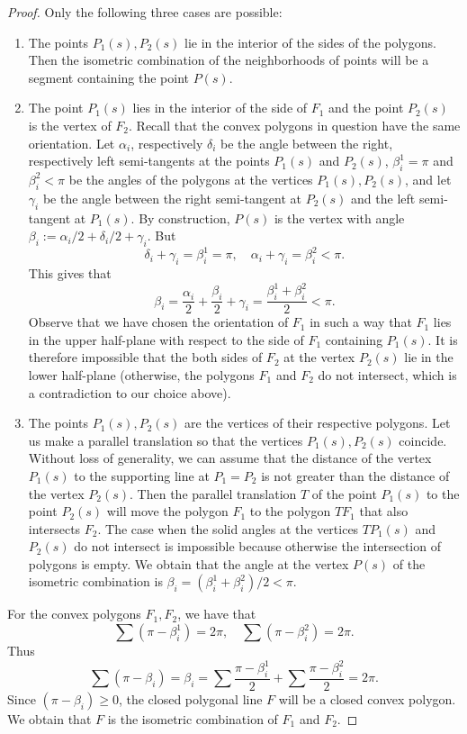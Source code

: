 \documentclass[11pt,oneside]{amsart}
\theoremstyle{theorem}
\theoremstyle{definition}
\theoremstyle{remark}
\begin{document}
\begin{proof}
Only the following three cases are possible:

\begin{enumerate}
\item
The points $P_1(s), P_2(s)$ lie in the interior of the sides of the polygons. Then the isometric combination of the neighborhoods of points will be a segment containing the point $P(s)$.

\item
The point $P_1(s)$ lies in the interior of the side of $F_1$ and the point $P_2(s)$ is the vertex of $F_2$. Recall that the convex polygons in question have the same orientation. Let $\alpha_i$, respectively $\delta_i$ be the angle between the right, respectively left semi-tangents at the points $P_1(s)$ and $P_2(s)$, $\beta^1_i = \pi$ and $\beta^2_i < \pi$ be the angles of the polygons at the vertices $P_1(s), P_2(s)$, and let $\gamma_i$ be the angle between the right semi-tangent at $P_2(s)$ and the left semi-tangent at $P_1(s)$.  By construction, $P(s)$ is the vertex with angle $\beta_i := \alpha_i / 2 + \delta_i / 2 + \gamma_i$. But
\[
\delta_i + \gamma_i = \beta_i^1 = \pi, \quad \alpha_i + \gamma_i = \beta_i^2 < \pi.
\]
This gives that
\[
\beta_i = \frac{\alpha_i}{2} + \frac{\beta_i}{2} + \gamma_i = \frac{\beta^1_i + \beta^2_i}{2} < \pi.
\]
Observe that we have chosen the orientation of $F_1$ in such a way that $F_1$ lies in the upper half-plane with respect to the side of $F_1$ containing $P_1(s)$. It is therefore impossible that the both sides of $F_2$ at the vertex $P_2(s)$ lie in the lower half-plane (otherwise, the polygons $F_1$ and $F_2$ do not intersect, which is a contradiction to our choice above). 

\item
The points $P_1(s), P_2(s)$ are the vertices of their respective polygons. Let us make a parallel translation so that the vertices $P_1(s), P_2(s)$ coincide. Without loss of generality, we can assume that the distance of the vertex $P_1(s)$ to the supporting line at $P_1 = P_2$ is not greater than the distance of the vertex $P_2(s)$. Then the parallel translation $T$ of the point $P_1(s)$ to the point $P_2(s)$ will move the polygon $F_1$ to the polygon $TF_1$ that also intersects $F_2$. The case when the solid angles at the vertices $TP_1(s)$ and $P_2(s)$ do not intersect is impossible because otherwise the intersection of polygons is empty. We obtain that the angle at the vertex $P(s)$ of the isometric combination is $\beta_i = (\beta_i^1 + \beta_i^2)/2 < \pi$. 
\end{enumerate}

For the convex polygons $F_1, F_2$, we have that
\[
\sum (\pi - \beta_i^1) = 2\pi, \quad \sum (\pi - \beta_i^2) = 2\pi.
\]
Thus
\[
\sum (\pi - \beta_i) = \beta_i = \sum \frac{\pi - \beta_i^1}{2} + \sum \frac{\pi - \beta_i^2}{2} = 2\pi. 
\]
Since $(\pi - \beta_i) \ge 0$, the closed polygonal line $F$ will be a closed convex polygon. We obtain that $F$ is the isometric combination of $F_1$ and $F_2$.  
\end{proof}
\end{document}
